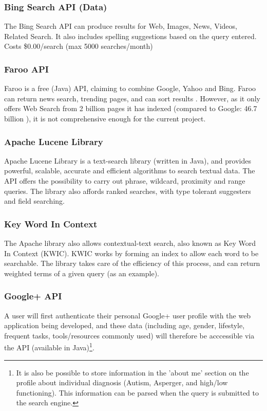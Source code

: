 \documentclass[a4paper, 10pt]{article}
\begin{document}
\subsubsection{Bing Search API (Data)}
The Bing Search API can produce results for Web, Images, News, Videos, Related Search. It also includes spelling suggestions based on the query entered. Costs \$0.00/search (max 5000 searches/month)

\subsubsection{Faroo API}
Faroo is a free (Java) API, claiming to combine Google, Yahoo and Bing. Faroo can return news search, trending pages, and can sort results \cite{faroo}. However, as it only offers Web Search from 2 billion pages it has indexed (compared to Google: 46.7 billion \cite{websize}), it is not comprehensive enough for the current project.

\subsubsection{Apache Lucene Library}\label{apache}
Apache Lucene Library is a text-search library (written in Java), and provides powerful, scalable, accurate and efficient algorithms to search textual data. The API offers the possibility to carry out phrase, wildcard, proximity and range queries. The library also affords ranked searches, with type tolerant suggesters and field searching.

\subsubsection{Key Word In Context} \label{KWIC} 
The Apache library also allows contextual-text search, also known as Key Word In Context (KWIC)\cite{kwic}. KWIC works by forming an index to allow each word to be searchable. The library takes care of the efficiency of this process, and can return weighted terms of a given query (as an example).


\subsubsection{Google+ API}
A user will first authenticate their personal Google+ user profile with the web application being developed, and these data (including age, gender, lifestyle, frequent tasks, tools/resources commonly used) will therefore be acccessible via the API (available in Java)\footnote{It is also be possible to store information in the 'about me' section on the profile about individual diagnosis (Autism, Asperger, and high/low functioning). This information can be parsed when the query is submitted to the search engine.}. 
\end{document}
